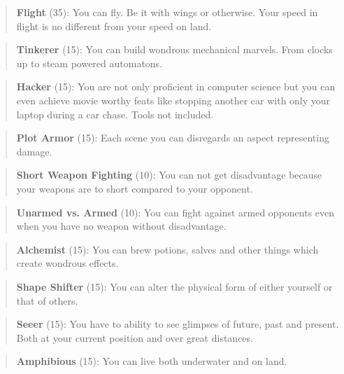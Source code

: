 \documentclass[11pt]{article}
\begin{document}
{\begin{quote}
\textbf{Flight} (35): You can fly. Be it with wings or otherwise. Your speed in flight is no different from your speed on land.
\end{quote}

\begin{quote}
\textbf{Tinkerer} (15): You can build wondrous mechanical marvels. From clocks up to steam powered automatons. 
\end{quote}

\begin{quote}
\textbf{Hacker} (15): You are not only proficient in computer science but you can even achieve movie worthy feats like stopping another car with only your laptop during a car chase. Tools not included.
\end{quote}

\begin{quote}
\textbf{Plot Armor} (15): Each scene you can disregards an aspect representing damage. 
\end{quote}

\begin{quote}
\textbf{Short Weapon Fighting} (10): You can not get disadvantage because your weapons are to short compared to your opponent.
\end{quote}

\begin{quote}
\textbf{Unarmed vs. Armed} (10): You can fight against armed opponents even when you have no weapon without disadvantage.
\end{quote}

\begin{quote}
\textbf{Alchemist} (15): You can brew potions, salves and other things which create wondrous effects.
\end{quote}

\begin{quote}
\textbf{Shape Shifter} (15): You can alter the physical form of either yourself or that of others.
\end{quote}

\begin{quote}
\textbf{Seeer} (15): You have to ability to see glimpses of future, past and present. Both at your current position and over great distances. 
\end{quote}

\begin{quote}
\textbf{Amphibious} (15): You can live both underwater and on land.
\end{quote}

}
\end{document}
